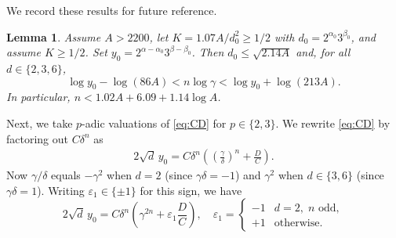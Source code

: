 \documentclass[11pt,a4paper]{article}
\newtheorem{lemma}[theorem]{Lemma}
\numberwithin{equation}{section}
\numberwithin{table}{section}
\numberwithin{figure}{section}
\begin{document}
We record these results for future reference.

\begin{lemma}\label{lem:n-bound}
	Assume $A > 2200$, let $K = 1.07A/d_0^2\ge 1/2$ with
	$d_0 = 2^{\alpha_0}3^{\beta_0}$, and assume $K \geq 1/2$.
	Set $y_0 = 2^{\alpha-\alpha_0}3^{\beta-\beta_0}$.
	Then $d_0 \leq \sqrt{2.14A}$ and, for all $d \in \{2,3,6\}$,
	\begin{equation*}
		\log y_0 - \log(86A) < n\log\gamma < \log y_0+\log(213A).
	\end{equation*}
	In particular, $n < 1.02A + 6.09 + 1.14\log A$.
\end{lemma}

\medskip

Next, we take $p$-adic valuations of \eqref{eq:CD} for $p\in \{2,3\}$. We rewrite \eqref{eq:CD} by factoring out $C\delta^n$ as
\begin{align*}
	2\sqrt{d}\,y_0 = C\delta^n\!\left(\left(\frac{\gamma}{\delta}\right)^{\!n}
	+ \frac{D}{C}\right).
\end{align*}
Now $\gamma/\delta$ equals $-\gamma^2$ when $d=2$ (since $\gamma\delta=-1$) and $\gamma^2$ when $d\in\{3,6\}$ (since $\gamma\delta=1$). Writing $\varepsilon_1 \in \{\pm 1\}$ for this sign, we have
\begin{equation}\label{eq:factor-sign}
	2\sqrt{d}\,y_0 = C\delta^n\!\left(\gamma^{2n}+\varepsilon_1\frac{D}{C}\right),
	\quad
	\varepsilon_1 = \begin{cases}-1 & d=2,\;n\text{ odd},\\ +1 & \text{otherwise.}\end{cases}
\end{equation}
\end{document}
